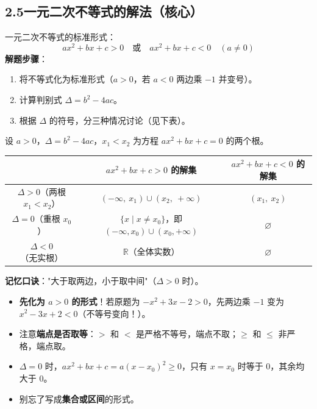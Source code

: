 \documentclass[12pt, a4paper]{ctexart}
\begin{document}
\subsection*{2.5\quad 一元二次不等式的解法（核心）}

\begin{knowledgebox}[一元二次不等式]
一元二次不等式的标准形式：
\[
  ax^2 + bx + c > 0 \quad \text{或} \quad ax^2 + bx + c < 0 \quad (a \neq 0)
\]
\textbf{解题步骤}：
\begin{enumerate}[leftmargin=2em]
  \item 将不等式化为标准形式（$a > 0$，若 $a < 0$ 两边乘 $-1$ 并变号）。
  \item 计算判别式 $\Delta = b^2 - 4ac$。
  \item 根据 $\Delta$ 的符号，分三种情况讨论（见下表）。
\end{enumerate}
\end{knowledgebox}

\begin{knowledgebox}[$a > 0$ 时三种情况的解集]
设 $a > 0$，$\Delta = b^2 - 4ac$，$x_1 < x_2$ 为方程 $ax^2 + bx + c = 0$ 的两个根。

\begin{center}
\renewcommand{\arraystretch}{1.6}
\begin{tabular}{c|c|c}
\toprule
& $ax^2 + bx + c > 0$ 的解集 & $ax^2 + bx + c < 0$ 的解集 \\
\midrule
$\Delta > 0$（两根 $x_1 < x_2$） & $(-\infty,\ x_1) \cup (x_2,\ +\infty)$ & $(x_1,\ x_2)$ \\
$\Delta = 0$（重根 $x_0$） & $\{x \mid x \neq x_0\}$，即 $(-\infty, x_0) \cup (x_0, +\infty)$ & $\varnothing$ \\
$\Delta < 0$（无实根） & $\mathbb{R}$（全体实数） & $\varnothing$ \\
\bottomrule
\end{tabular}
\end{center}
\textbf{记忆口诀}："大于取两边，小于取中间"（$\Delta > 0$ 时）。
\end{knowledgebox}

\begin{warnbox}
\begin{itemize}[leftmargin=2em]
  \item \textbf{先化为 $a > 0$ 的形式}！若原题为 $-x^2 + 3x - 2 > 0$，先两边乘 $-1$ 变为 $x^2 - 3x + 2 < 0$（不等号变向！）。
  \item 注意\textbf{端点是否取等}：$>$ 和 $<$ 是严格不等号，端点不取；$\geq$ 和 $\leq$ 非严格，端点取。
  \item $\Delta = 0$ 时，$ax^2 + bx + c = a(x - x_0)^2 \geq 0$，只有 $x = x_0$ 时等于 $0$，其余均大于 $0$。
  \item 别忘了写成\textbf{集合或区间}的形式。
\end{itemize}
\end{warnbox}
\end{document}
